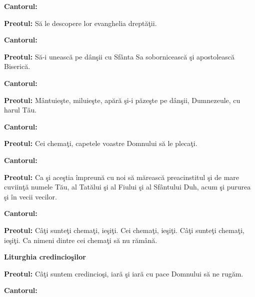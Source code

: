 \documentclass[11pt,letterpaper]{book} \usepackage{ucs}
\newcommand{\mysection}[1]{\begin{center}{\Large \bf #1}\end{center}}
\begin{document}
  {\bf Cantorul:}
  \begin{center}
  \end{center}

  {\bf Preotul:} Să le descopere lor evanghelia dreptăţii.

  {\bf Cantorul:}
  \begin{center}
  \end{center}
  \pagebreak

  {\bf Preotul:} Să-i unească pe dânşii cu Sfânta Sa sobornicească şi
  apostolească Biserică.

  {\bf Cantorul:}
  \begin{center}
  \end{center}

  {\bf Preotul:} Mântuieşte, miluieşte, apără şi-i păzeşte pe dânşii,
  Dumnezeule, cu harul Tău.

  {\bf Cantorul:}
  \begin{center}
  \end{center}
  \pagebreak

  {\bf Preotul:} Cei chemaţi, capetele voastre Domnului să le plecaţi.

  {\bf Cantorul:}
  \begin{center}
  \end{center}

  {\bf Preotul:} Ca şi aceştia împreună cu noi să mărească
  preacinstitul şi de mare cuviinţă numele Tău, al Tatălui şi al
  Fiului şi al Sfântului Duh, acum şi pururea şi în vecii vecilor.

  {\bf Cantorul:}
  \begin{center}
  \end{center}

  {\bf Preotul:} Câţi sunteţi chemaţi, ieşiţi. Cei chemaţi,
  ieşiţi. Câţi sunteţi chemaţi, ieşiţi. Ca nimeni dintre cei chemaţi
  să nu rămână.
  \pagebreak

  \mysection{Liturghia credincioşilor}

  {\bf Preotul:} Câţi suntem credincioşi, iară şi iară cu pace
  Domnului să ne rugăm.

  {\bf Cantorul:}
  \begin{center}
  \end{center}
\end{document}
